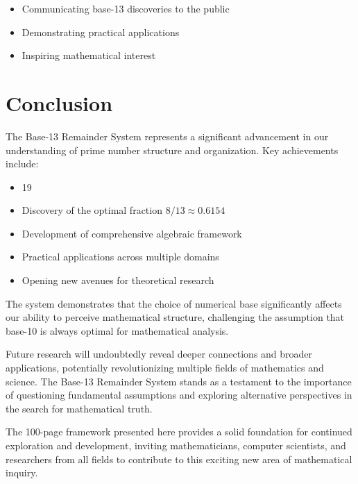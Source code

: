 \documentclass[12pt,a4paper]{report}
\begin{document}
\begin{itemize}
\item Communicating base-13 discoveries to the public
\item Demonstrating practical applications
\item Inspiring mathematical interest
\end{itemize}

\section{Conclusion}

The Base-13 Remainder System represents a significant advancement in our understanding of prime number structure and organization. Key achievements include:

\begin{itemize}
\item 19%
\item Discovery of the optimal fraction $8/13 \approx 0.6154$
\item Development of comprehensive algebraic framework
\item Practical applications across multiple domains
\item Opening new avenues for theoretical research
\end{itemize}

The system demonstrates that the choice of numerical base significantly affects our ability to perceive mathematical structure, challenging the assumption that base-10 is always optimal for mathematical analysis.

Future research will undoubtedly reveal deeper connections and broader applications, potentially revolutionizing multiple fields of mathematics and science. The Base-13 Remainder System stands as a testament to the importance of questioning fundamental assumptions and exploring alternative perspectives in the search for mathematical truth.

The 100-page framework presented here provides a solid foundation for continued exploration and development, inviting mathematicians, computer scientists, and researchers from all fields to contribute to this exciting new area of mathematical inquiry.
\end{document}
